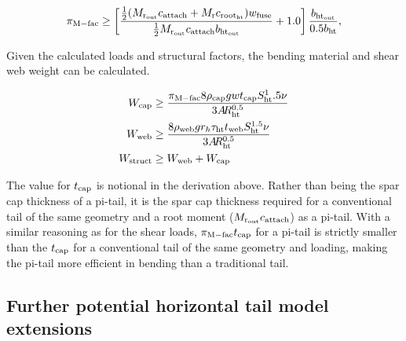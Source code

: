\begin{equation}
    \pi_{\rm{M-fac}} \geq \left[\frac{\frac{1}{2}(M_{\rm{r}_{\rm{out}}} c_{\rm{attach}} +
    M_{\rm{r}} c_{\rm{root}_{\rm{ht}}}) w_{\textrm{fuse}}} {\frac{1}{2}M_{\rm{r}_{\rm{out}}} c_{\rm{attach}} 
b_{\rm{ht}_{\rm{out}}}} + 1.0\right]
    \frac{b_{\rm{ht}_{\rm{out}}}} {0.5b_{\rm{ht}}},
\end{equation}

Given the calculated loads and structural factors, the bending material and 
shear web weight can be calculated. 

\begin{align}
    W_{\rm{cap}} &\geq \frac{\pi_{\rm{M-fac}} 8 \rho_{\rm{cap}} g w t_{\rm{cap}} S_{\rm{ht}}^1.5 \nu}
    {3A\hspace{-2.0pt}R_{\rm{ht}}^{0.5}}\\
    W_{\rm{web}} &\geq \frac{8 \rho_{\rm{web}} g r_h \tau_{\rm{ht}} t_{\rm{web}} S_{\rm{ht}}^{1.5} 
\nu}{3A\hspace{-2.0pt}R_{\rm{ht}}^{0.5}}\\
    W_{\rm{struct}} &\geq W_{\rm{web}} + W_{\rm{cap}}
\end{align}

The value for $t_{\rm{cap}}$ is notional in the derivation above. Rather than being 
the spar cap thickness of a pi-tail, it is the spar cap thickness required for a 
conventional tail of the same geometry and a root moment  ($M_{\rm{r}_{\rm{out}}} 
c_{\rm{attach}}$) as a pi-tail. With a similar reasoning as for the shear loads, 
$\pi_{\rm{M-fac}} t_{\rm{cap}}$ for a pi-tail is strictly smaller than the $t_{\rm{cap}}$ for a 
conventional tail of the same geometry and loading, making the pi-tail more 
efficient in bending than a traditional tail. 

\subsection{Further potential horizontal tail model extensions}
\label{sec:HTExtensions}